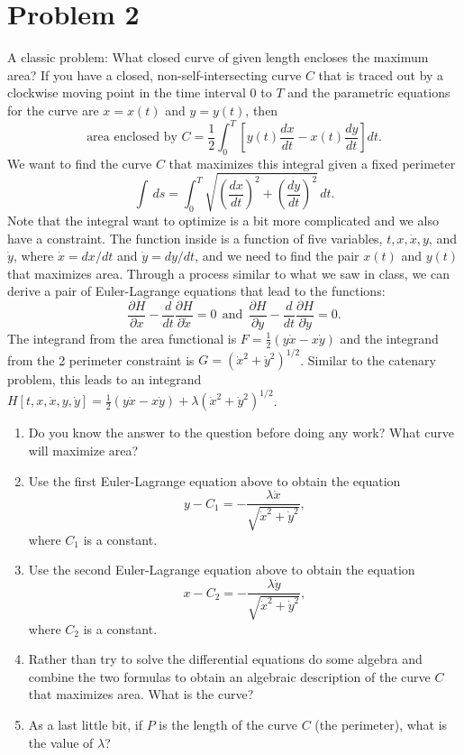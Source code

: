 \documentclass[letterpaper, 12pt]{amsart}
\theoremstyle{definition}  							%
\begin{document}
	\section*{Problem 2}
	A classic problem: What closed curve of given length encloses the maximum area?
	If you have a closed, non-self-intersecting curve $C$ that is traced out by a clockwise moving point in the time interval $0$ to $T$ and the parametric equations for the curve are $x = x(t)$ and $y = y(t)$, then $$\text{area enclosed by $C = \frac{1}{2}\int_{0}^{T} \left[ y(t)\frac{dx}{dt} - x(t)\frac{dy}{dt} \right] dt$.}$$
	We want to find the curve $C$ that maximizes this integral given a fixed perimeter $$\int \, ds = \int_{0}^{T} \sqrt{\left( \frac{dx}{dt} \right)^{2} + \left( \frac{dy}{dt} \right)^{2}} \, dt.$$
	Note that the integral want to optimize is a bit more complicated and we also have a constraint. 
	The function inside is a function of five variables, $t, x, \dot{x}, y$, and $\dot{y}$, where $\dot{x} = dx/dt$ and $\dot{y} = dy/dt$, and we need to find the pair $x(t)$ and $y(t)$ that maximizes area. 
	Through a process similar to what we saw in class, we can derive a pair of Euler-Lagrange equations that lead to the functions: $$\frac{\partial H}{\partial x} - \frac{d}{dt}\frac{\partial H}{\partial \dot{x}} = 0 \ \ \text{and} \ \ \frac{\partial H}{\partial y} - \frac{d}{dt}\frac{\partial H}{\partial \dot{y}} = 0.$$
	The integrand from the area functional is $F = \tfrac{1}{2}(y\dot{x} - x\dot{y})$ and the integrand from the 2 perimeter constraint is $G = (\dot{x}^{2} + \dot{y}^{2})^{1/2}$. 
	Similar to the catenary problem, this leads to an integrand $H[t, x, \dot{x}, y, \dot{y}] = \tfrac{1}{2}(y\dot{x} - x\dot{y})+\lambda(\dot{x}^{2} + \dot{y}^{2})^{1/2}$.

	\begin{enumerate}[\hspace{6mm}(a)]
		\item Do you know the answer to the question before doing any work? 
		What curve will maximize area?

		\item Use the first Euler-Lagrange equation above to obtain the equation $$y - C_{1} = -\frac{\lambda\dot{x}}{\sqrt{\dot{x}^{2} + \dot{y}^{2}}},$$ where $C_{1}$ is a constant.

		\item Use the second Euler-Lagrange equation above to obtain the equation $$x - C_{2} = -\frac{\lambda\dot{y}}{\sqrt{\dot{x}^{2} + \dot{y}^{2}}},$$ where $C_{2}$ is a constant.

		\item Rather than try to solve the differential equations do some algebra and combine the two formulas to obtain an algebraic description of the curve $C$ that maximizes area. 
		What is the curve?

		\item As a last little bit, if $P$ is the length of the curve $C$ (the perimeter), what is the value of $\lambda$?
	\end{enumerate}
	
\end{document}
